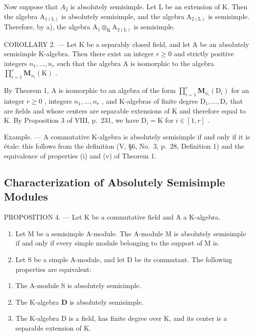 Now suppose that \(A_{2}\) is absolutely semisimple. Let L be an extension of K. Then the algebra \(\mathrm{A}_{1(\mathrm{L})}\) is absolutely semisimple, and the algebra \(\mathrm{A}_{2(\mathrm{L})}\) is semisimple. Therefore, by a), the algebra \(\mathrm{A}_{1} \otimes_{\mathrm{K}} \mathrm{A}_{2(\mathrm{L})}\) is semisimple.

COROLLARY 2. --- Let K be a separably closed field, and let A be an absolutely semisimple K-algebra. Then there exist an integer \(r \geqslant 0\) and strictly positive integers \(n_{1}, \ldots, n_{r}\) such that the algebra A is isomorphic to the algebra \(\prod_{i=1}^{r} \mathbf{M}_{n_{i}}(\mathrm{K})\) .

By Theorem 1, A is isomorphic to an algebra of the form \(\prod_{i=1}^{r} \mathbf{M}_{n_i}(\mathrm{D}_i)\) for an integer \(r \geqslant 0\) , integers \(n_1, \ldots, n_r\) , and K-algebras of finite degree \(\mathrm{D}_1, \ldots, \mathrm{D}_r\) that are fields and whose centers are separable extensions of K and therefore equal to K. By Proposition 3 of VIII, p.~231, we have \(\mathrm{D}_i = \mathrm{K}\) for \(i \in [1, r]\) .

Example. --- A commutative K-algebra is absolutely semisimple if and only if it is étale: this follows from the definition (V, §6, No.~3, p.~28, Definition 1) and the equivalence of properties (i) and (v) of Theorem 1.

\subsection{Characterization of Absolutely Semisimple Modules}

PROPOSITION 4. --- Let K be a commutative field and A a K-algebra.

\begin{enumerate}
\def\labelenumi{\alph{enumi})}
\item
  Let M be a semisimple A-module. The A-module M is absolutely semisimple if and only if every simple module belonging to the support of M is.
\item
  Let S be a simple A-module, and let D be its commutant. The following properties are equivalent:
\end{enumerate}

\begin{enumerate}
\def\labelenumi{(\roman{enumi})}
\item
  The A-module S is absolutely semisimple.
\item
  The K-algebra \(\mathbf{D}\) is absolutely semisimple.
\item
  The K-algebra D is a field, has finite degree over K, and its center is a separable extension of K.
\end{enumerate}

